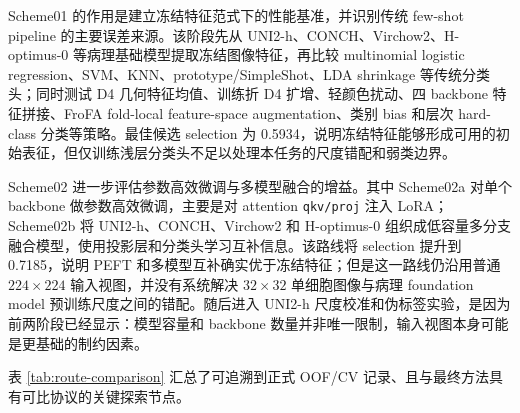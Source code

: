 \documentclass[a4paper,12pt]{article}
\begin{document}
Scheme01 的作用是建立冻结特征范式下的性能基准，并识别传统 few-shot pipeline 的主要误差来源。该阶段先从 UNI2-h、CONCH、Virchow2、H-optimus-0 等病理基础模型提取冻结图像特征，再比较 multinomial logistic regression、SVM、KNN、prototype/SimpleShot、LDA shrinkage 等传统分类头；同时测试 D4 几何特征均值、训练折 D4 扩增、轻颜色扰动、四 backbone 特征拼接、FroFA fold-local feature-space augmentation、类别 bias 和层次 hard-class 分类等策略。最佳候选 selection 为 0.5934，说明冻结特征能够形成可用的初始表征，但仅训练浅层分类头不足以处理本任务的尺度错配和弱类边界。

Scheme02 进一步评估参数高效微调与多模型融合的增益。其中 Scheme02a 对单个 backbone 做参数高效微调，主要是对 attention \texttt{qkv/proj} 注入 LoRA；Scheme02b 将 UNI2-h、CONCH、Virchow2 和 H-optimus-0 组织成低容量多分支融合模型，使用投影层和分类头学习互补信息。该路线将 selection 提升到 0.7185，说明 PEFT 和多模型互补确实优于冻结特征；但是这一路线仍沿用普通 \(224\times224\) 输入视图，并没有系统解决 \(32\times32\) 单细胞图像与病理 foundation model 预训练尺度之间的错配。随后进入 UNI2-h 尺度校准和伪标签实验，是因为前两阶段已经显示：模型容量和 backbone 数量并非唯一限制，输入视图本身可能是更基础的制约因素。

表 \ref{tab:route-comparison} 汇总了可追溯到正式 OOF/CV 记录、且与最终方法具有可比协议的关键探索节点。
\end{document}
